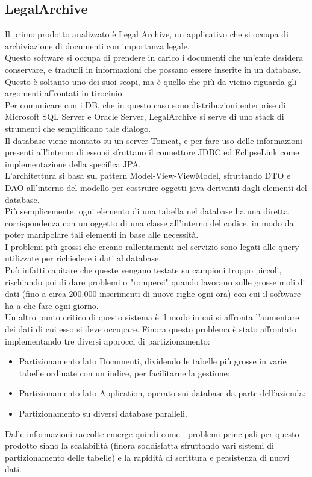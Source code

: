 \subsection{LegalArchive}
Il primo prodotto analizzato è Legal Archive, un applicativo che si occupa di archiviazione di documenti con importanza legale.\\
Questo software si occupa di prendere in carico i documenti che un'ente desidera conservare, e tradurli in informazioni che possano essere inserite in un database.\\
Questo è soltanto uno dei suoi scopi, ma è quello che più da vicino riguarda gli argomenti affrontati in tirocinio.\\
Per comunicare con i DB, che in questo caso sono distribuzioni enterprise di Microsoft SQL Server e Oracle Server, LegalArchive si serve di uno stack di strumenti che semplificano tale dialogo.\\
Il database viene montato su un server Tomcat, e per fare uso delle informazioni presenti all'interno di esso si sfruttano il connettore JDBC ed EclipseLink come implementazione della specifica JPA.\\
L'architettura si basa sul pattern Model-View-ViewModel, sfruttando DTO e DAO all'interno del modello per costruire oggetti java derivanti dagli elementi del database.\\
Più semplicemente, ogni elemento di una tabella nel database ha una diretta corrispondenza con un oggetto di una classe all'interno del codice, in modo da poter manipolare tali elementi in base alle necessità.\\
I problemi più grossi che creano rallentamenti nel servizio sono legati alle query utilizzate per richiedere i dati al database.\\
Può infatti capitare che queste vengano testate su campioni troppo piccoli, rischiando poi di dare problemi o "rompersi" quando lavorano sulle grosse moli di dati (fino a circa 200.000 inserimenti di nuove righe ogni ora) con cui il software ha a che fare ogni giorno.\\
Un altro punto critico di questo sistema è il modo in cui si affronta l'aumentare dei dati di cui esso si deve occupare. Finora questo problema è stato affrontato implementando tre diversi approcci di partizionamento:
\begin{itemize}
    \item Partizionamento lato Documenti, dividendo le tabelle più grosse in varie tabelle ordinate con un indice, per facilitarne la gestione;
    \item Partizionamento lato Application, operato sui database da parte dell'azienda;
    \item Partizionamento su diversi database paralleli.
\end{itemize}
Dalle informazioni raccolte emerge quindi come i problemi principali per questo prodotto siano la scalabilità (finora soddisfatta sfruttando vari sistemi di partizionamento delle tabelle) e la rapidità di scrittura e persistenza di nuovi dati.\\

